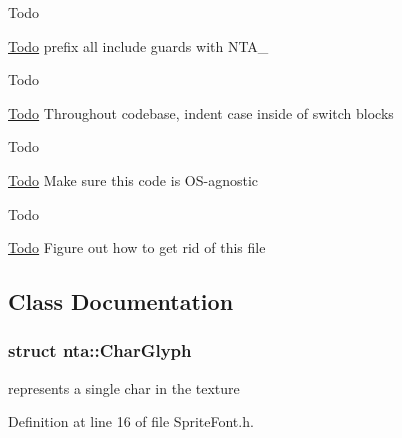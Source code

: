 \begin{DoxyRefDesc}{Todo}
\item[\hyperlink{todo__todo000007}{Todo}]prefix all include guards with N\+T\+A\+\_\+ \end{DoxyRefDesc}
\begin{DoxyRefDesc}{Todo}
\item[\hyperlink{todo__todo000008}{Todo}]Throughout codebase, indent {\ttfamily case} inside of {\ttfamily switch} blocks \end{DoxyRefDesc}


\begin{DoxyRefDesc}{Todo}
\item[\hyperlink{todo__todo000014}{Todo}]Make sure this code is O\+S-\/agnostic \end{DoxyRefDesc}


\begin{DoxyRefDesc}{Todo}
\item[\hyperlink{todo__todo000030}{Todo}]Figure out how to get rid of this file \end{DoxyRefDesc}


\subsection{Class Documentation}
\label{structnta_1_1CharGlyph}
\subsubsection{struct nta\+:\+:Char\+Glyph}
represents a single char in the texture 

Definition at line 16 of file Sprite\+Font.\+h.



